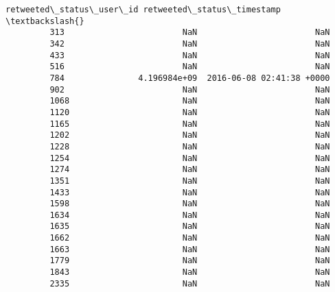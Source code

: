 \documentclass[11pt]{article}
\begin{document}
\begin{Verbatim}[commandchars=\\\{\}]
               retweeted\_status\_user\_id retweeted\_status\_timestamp  \textbackslash{}
         313                        NaN                        NaN   
         342                        NaN                        NaN   
         433                        NaN                        NaN   
         516                        NaN                        NaN   
         784               4.196984e+09  2016-06-08 02:41:38 +0000   
         902                        NaN                        NaN   
         1068                       NaN                        NaN   
         1120                       NaN                        NaN   
         1165                       NaN                        NaN   
         1202                       NaN                        NaN   
         1228                       NaN                        NaN   
         1254                       NaN                        NaN   
         1274                       NaN                        NaN   
         1351                       NaN                        NaN   
         1433                       NaN                        NaN   
         1598                       NaN                        NaN   
         1634                       NaN                        NaN   
         1635                       NaN                        NaN   
         1662                       NaN                        NaN   
         1663                       NaN                        NaN   
         1779                       NaN                        NaN   
         1843                       NaN                        NaN   
         2335                       NaN                        NaN   
         

\end{Verbatim}
\end{document}

